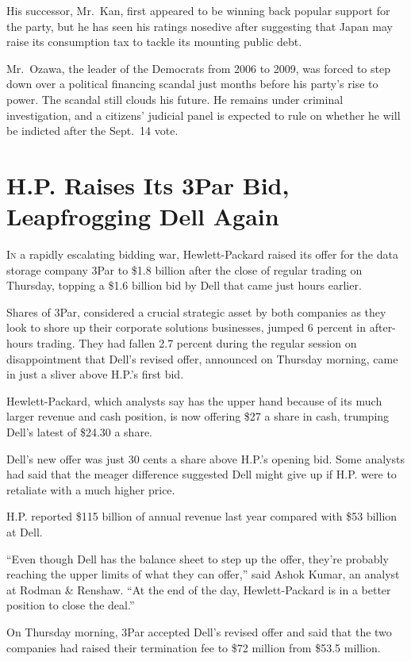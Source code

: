 ﻿\documentclass[12pt]{article}
\begin{document}
His successor, Mr.~Kan, first appeared to be winning back popular support for the party, but he has
seen his ratings nosedive after suggesting that Japan may raise its consumption tax to tackle its
mounting public debt.

Mr.~Ozawa, the leader of the Democrats from 2006 to 2009, was forced to step down over a political
financing scandal just months before his party's rise to power. The scandal still clouds his future.
He remains under criminal investigation, and a citizens' judicial panel is expected to rule on
whether he will be indicted after the Sept.~14 vote.

\pagebreak
\section{H.P. Raises Its 3Par Bid, Leapfrogging Dell Again}

\lettrine{I}{n} a rapidly escalating bidding war, Hewlett-Packard raised its
offer for the data storage company 3Par to \$1.8 billion after the close of regular trading on
Thursday, topping a \$1.6 billion bid by Dell that came just hours earlier.

Shares of 3Par, considered a crucial strategic asset by both companies as they look to shore up
their corporate solutions businesses, jumped 6 percent in after-hours trading. They had fallen 2.7
percent during the regular session on disappointment that Dell's revised offer, announced on
Thursday morning, came in just a sliver above H.P.'s first bid.

Hewlett-Packard, which analysts say has the upper hand because of its much larger revenue and cash
position, is now offering \$27 a share in cash, trumping Dell's latest of \$24.30 a share.

Dell's new offer was just 30 cents a share above H.P.'s opening bid. Some analysts had said that the
meager difference suggested Dell might give up if H.P. were to retaliate with a much higher price.

H.P. reported \$115 billion of annual revenue last year compared with \$53 billion at Dell.

``Even though Dell has the balance sheet to step up the offer, they're probably reaching the upper
limits of what they can offer,'' said Ashok Kumar, an analyst at Rodman \& Renshaw. ``At the end of
the day, Hewlett-Packard is in a better position to close the deal.''

On Thursday morning, 3Par accepted Dell's revised offer and said that the two companies had raised
their termination fee to \$72 million from \$53.5 million.
\end{document}
